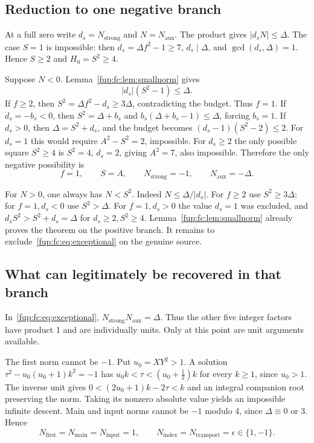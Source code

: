 \documentclass[11pt,letterpaper]{article}
\theoremstyle{definition}\newtheorem{definition}[theorem]{Definition}
\theoremstyle{remark}\newtheorem{remark}[theorem]{Remark}
\newcommand{\D}{\Delta}
\newcommand{\Nf}{N_{\mathrm{first}}}\newcommand{\Nm}{N_{\mathrm{main}}}\newcommand{\Ni}{N_{\mathrm{input}}}
\newcommand{\Na}{N_{\mathrm{aux}}}\newcommand{\Nk}{N_{\mathrm{index}}}\newcommand{\Nt}{N_{\mathrm{transport}}}
\newcommand{\Ns}{N_{\mathrm{strong}}}
\begin{document}
\subsection{Reduction to one negative branch}
At a full zero write $d_s=\Ns$ and $N=\Na$. The product gives
$|d_sN|\le\D$. The case $S=1$ is impossible: then
$d_s=\D f^2-1\ge7$, $d_s\mid\D$, and $\gcd(d_s,\D)=1$.
Hence $S\ge2$ and $H_0=S^2\ge4$.

Suppose $N<0$. Lemma~\ref{fup:fc:lem:smallnorm} gives
\begin{equation}
 |d_s|(S^2-1)\le\D.\label{fup:fc:eq:budget}
\end{equation}
If $f\ge2$, then $S^2=\D f^2-d_s\ge3\D$, contradicting the budget.
Thus $f=1$. If $d_s=-b_s<0$, then
$S^2=\D+b_s$ and $b_s(\D+b_s-1)\le\D$, forcing $b_s=1$.
If $d_s>0$, then $\D=S^2+d_s$, and the budget becomes
$(d_s-1)(S^2-2)\le2$. For $d_s=1$ this would require
$A^2-S^2=2$, impossible. For $d_s\ge2$ the only possible square
$S^2\ge4$ is $S^2=4$, $d_s=2$, giving $A^2=7$, also impossible.
Therefore the only negative possibility is
\begin{equation}
 f=1,\qquad S=A,\qquad\Ns=-1,\qquad\Na=-\D.\label{fup:fc:eq:exceptional}
\end{equation}

For $N>0$, one always has $N<S^2$. Indeed $N\le\D/|d_s|$.
For $f\ge2$ use $S^2\ge3\D$; for $f=1,d_s<0$ use $S^2>\D$.
For $f=1,d_s>0$ the value $d_s=1$ was excluded, and
$d_sS^2>S^2+d_s=\D$ for $d_s\ge2,S^2\ge4$.
Lemma~\ref{fup:fc:lem:smallnorm} already proves the theorem on the positive branch.
It remains to exclude~\eqref{fup:fc:eq:exceptional} on the genuine source.

\subsection{What can legitimately be recovered in that branch}
In~\eqref{fup:fc:eq:exceptional}, $\Ns\Na=\D$. Thus the other five integer
factors have product 1 and are individually units. Only at this point
are unit arguments available.

The first norm cannot be $-1$. Put $u_0=XY^2>1$. A solution
$\tau^2-u_0(u_0+1)k^2=-1$ has
$u_0k<\tau<(u_0+\tfrac12)k$ for every $k\ge1$, since $u_0>1$.
The inverse unit gives
$0<(2u_0+1)k-2\tau<k$ and an integral companion root preserving the norm.
Taking its nonzero absolute value yields an impossible infinite descent.
Main and input norms cannot be $-1$ modulo 4, since $\D\equiv0$ or 3.
Hence
\begin{equation}
 \Nf=\Nm=\Ni=1,\qquad\Nk=\Nt=\epsilon\in\{1,-1\}.\label{fup:fc:eq:fiveunits}
\end{equation}
\end{document}
